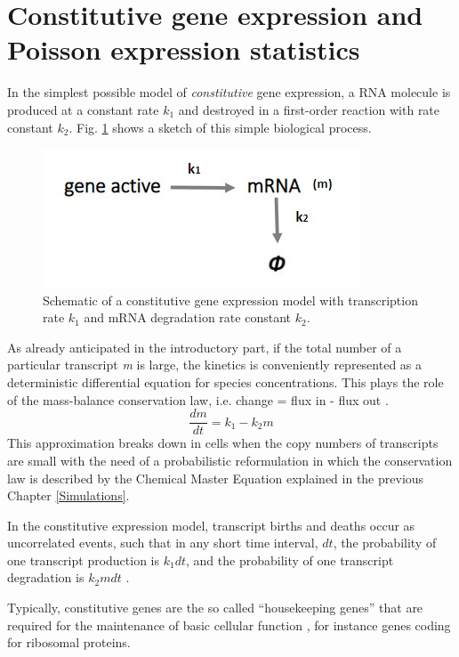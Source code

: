 \documentclass[12pt,a4paper]{report}
\begin{document}
\section{Constitutive gene expression and Poisson expression statistics}\label{modelconstitutivegeneexpression}
In the simplest possible model of \emph{constitutive} gene expression, a RNA molecule is produced at a constant rate $k_{1}$ and destroyed in a first-order reaction with rate constant $k_{2}$. Fig. \ref{costitutiveexpression} shows a sketch of this simple biological process.

\begin{figure}[!ht]
\centering
\includegraphics[scale=0.64]{costitutiveexpression.jpg}
\caption{Schematic of a constitutive gene expression model with transcription rate $k_{1}$ and mRNA degradation rate constant $k_{2}$.}
\label{costitutiveexpression}
\end{figure}

As already anticipated in the introductory part, if the total number of a particular transcript \emph{m} is large, the kinetics is conveniently represented as a deterministic differential equation for species concentrations. This plays the role of the mass-balance conservation law, i.e. change = flux in - flux out \cite{geneexpressionnoise}.
\begin{equation}\label{RNAcostitutiveexpressionequation}
 \frac{dm}{dt} = k_{1} - k_{2}m
\end{equation}
This approximation breaks down in cells when the copy numbers of transcripts are small with the need of a probabilistic reformulation in which the conservation law is described by the Chemical Master Equation explained in the previous Chapter \ref{Simulations}. 

In the constitutive expression model, transcript births and deaths occur as uncorrelated events, such that in any short time interval, $dt$, the probability of one transcript production is $k_{1}dt$, and the probability of one transcript degradation is $k_{2}mdt$ \cite{geneexpressionnoise}.

Typically, constitutive genes are the so called ``housekeeping genes'' that are required for the maintenance of basic cellular function \cite{housekeepinggene}, for instance genes coding for ribosomal proteins.
\end{document}
